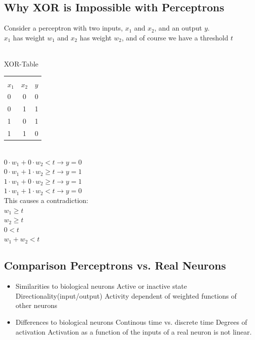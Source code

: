 \documentclass[english,11pt]{article}
\begin{document}
\subsection{Why XOR is Impossible with Perceptrons}
Consider a perceptron with two inputs, $x_1$ and $x_2$, and an output $y$.\\$x_1$ has weight $w_1$ and $x_2$ has weight $w_2$, and of course we have a threshold $t$\\ \\
\begin{center}
XOR-Table\\
\begin{tabular}[t width=1 \textwidth]{ |l| |c| |r| }
\hline & & \\ $x_1$ & $x_2$ & $y$\\ \hline
0 & 0 & 0\\ \hline
0 & 1 & 1\\ \hline
1 & 0 & 1\\ \hline
1 & 1 & 0\\ \hline
\end{tabular}\\[2\baselineskip]
$0 \cdot w_1 + 0 \cdot w_2 < t \rightarrow y=0$ \\
$0 \cdot w_1 + 1 \cdot w_2 \ge t \rightarrow y=1$ \\
$1 \cdot w_1 + 0 \cdot w_2 \ge t \rightarrow y=1$ \\
$1 \cdot w_1 + 1 \cdot w_2 < t \rightarrow y=0$ \\[2\baselineskip]
This causes a contradiction:\\
$w_1 \ge t$ \\
$w_2 \ge t$ \\
$0 < t$\\
$w_1 + w_2 < t$


\end{center}

\subsection{Comparison Perceptrons vs. Real Neurons}

\begin{itemize}
\item Similarities to biological neurons
\subitem Active or inactive state
\subitem Directionality(input/output)
\subitem Activity dependent of weighted functions of other neurons
\item Differences to biological neurons
\subitem Continous time vs. discrete time
\subitem Degrees of activation
\subitem Activation as a function of the inputs of a real neuron is not linear.
\end{itemize}
\end{document}
